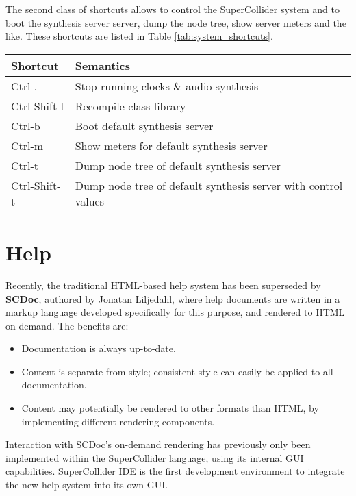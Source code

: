\documentclass[11pt,a4paper]{article}
\begin{document}
The second class of shortcuts allows to control the SuperCollider system and to boot the synthesis server server, dump
the node tree, show server meters and the like. These shortcuts are listed in Table \ref{tab:system_shortcuts}.

\begin{table*}[b]
\begin{tabular}{  l  l  }
  \toprule
  Shortcut & Semantics \\
  \midrule

  Ctrl-. & Stop running clocks \& audio synthesis \\
  Ctrl-Shift-l & Recompile class library \\
  Ctrl-b & Boot default synthesis server \\
  Ctrl-m & Show meters for default synthesis server \\
  Ctrl-t & Dump node tree of default synthesis server \\
  Ctrl-Shift-t & Dump node tree of default synthesis server with control values \\

  \bottomrule
\end{tabular}
\caption{System Control Shortcuts}
\label{tab:system_shortcuts}
\end{table*}


\section{Help}

Recently, the traditional HTML-based help system has been superseded by \textbf{SCDoc}, authored by
Jonatan Liljedahl, where help documents are written in a markup language developed specifically
for this purpose, and rendered to HTML on demand. The benefits are:
\begin{itemize}
 \item Documentation is always up-to-date.
 \item Content is separate from style; consistent style can easily be applied to all documentation.
 \item Content may potentially be rendered to other formats than HTML, by implementing different
rendering components.
\end{itemize}

Interaction with SCDoc's on-demand rendering has previously only been implemented within the
SuperCollider language, using its internal GUI capabilities. SuperCollider IDE is the first
development environment to integrate the new help system into its own GUI.
\end{document}

